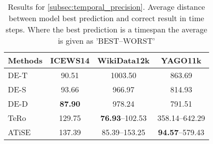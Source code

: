 \begin{table}[htb]
\centering
\begin{minipage}{0.95\columnwidth}
\centering
\caption{Results for \autoref{subsec:temporal_precision}. Average distance between model best prediction and correct result in time steps. Where the best prediction is a timespan the average is given as '\textsc{BEST}–\textsc{WORST}'}
\vspace{-3mm}

\begin{tabular}{lccc}
\hline
Methods & ICEWS14 & WikiData12k & YAGO11k\\
\hline
DE-T & 90.51 & 1003.50 & 863.69\\
DE-S & 93.66 & 966.97 & 814.93\\
DE-D & \textbf{87.90} & 978.24 & 791.51\\
TeRo & 129.75 & \textbf{76.93}–102.53 & 358.14–642.29\\
ATiSE & 137.39 & 85.39–153.25 & \textbf{94.57}–579.43\\
\hline

\end{tabular}

\label{tab:temporal_precision_avg_diff}
\end{minipage}
\end{table}
